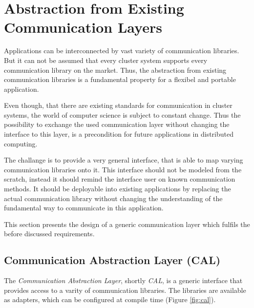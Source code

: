 \section{Abstraction from Existing Communication Layers}

Applications can be interconnected by vast variety of communication
libraries. But it can not be assumed that every cluster system
supports every communication library on the market.  Thus, the
abstraction from existing communication libraries is a fundamental
property for a flexibel and portable application.

Even though, that there are existing standards for communication in
cluster systems, the world of computer science is subject to constant
change. Thus the possibility to exchange the used communication layer
without changing the interface to this layer, is a precondition for
future applications in distributed computing.

The challange is to provide a very general interface, that is able to
map varying communication libraries onto it. This interface should not
be modeled from the scratch, instead it should remind the interface
user on known communication methods. It should be deployable into existing
applications by replacing the actual communication library without
changing the understanding of the fundamental way to communicate in
this application.

This section presents the design of a generic communication layer
which fulfils the before discussed requirements.

\subsection{Communication Abstraction Layer (CAL)}
\label{sec:cal}
The \textit{Communication Abstraction Layer}, shortly \textit{CAL}, is
a generic interface that provides access to a varity of communication
libraries. The libraries are available as adapters, which can be
configured at compile time (Figure \ref{fig:cal}).

